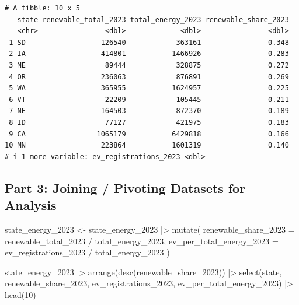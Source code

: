\documentclass[
  letterpaper,
  DIV=11,
  numbers=noendperiod]{scrartcl}
\newenvironment{Shaded}{\begin{snugshade}}{\end{snugshade}}
\newcommand{\AttributeTok}[1]{\textcolor[rgb]{0.40,0.45,0.13}{#1}}
\newcommand{\DecValTok}[1]{\textcolor[rgb]{0.68,0.00,0.00}{#1}}
\newcommand{\FunctionTok}[1]{\textcolor[rgb]{0.28,0.35,0.67}{#1}}
\newcommand{\NormalTok}[1]{\textcolor[rgb]{0.00,0.23,0.31}{#1}}
\newcommand{\OtherTok}[1]{\textcolor[rgb]{0.00,0.23,0.31}{#1}}
\newcommand{\SpecialCharTok}[1]{\textcolor[rgb]{0.37,0.37,0.37}{#1}}
\begin{document}
\begin{verbatim}
# A tibble: 10 x 5
   state renewable_total_2023 total_energy_2023 renewable_share_2023
   <chr>                <dbl>             <dbl>                <dbl>
 1 SD                  126540            363161                0.348
 2 IA                  414801           1466926                0.283
 3 ME                   89444            328875                0.272
 4 OR                  236063            876891                0.269
 5 WA                  365955           1624957                0.225
 6 VT                   22209            105445                0.211
 7 NE                  164503            872370                0.189
 8 ID                   77127            421975                0.183
 9 CA                 1065179           6429818                0.166
10 MN                  223864           1601319                0.140
# i 1 more variable: ev_registrations_2023 <dbl>
\end{verbatim}

\subsection{\texorpdfstring{\textbf{Part 3: Joining / Pivoting Datasets
for
Analysis}}{Part 3: Joining / Pivoting Datasets for Analysis}}\label{part-3-joining-pivoting-datasets-for-analysis}

\begin{Shaded}
\begin{Highlighting}[]
\NormalTok{state\_energy\_2023 }\OtherTok{\textless{}{-}}
\NormalTok{  state\_energy\_2023 }\SpecialCharTok{|\textgreater{}}
  \FunctionTok{mutate}\NormalTok{(}
    \AttributeTok{renewable\_share\_2023 =}\NormalTok{ renewable\_total\_2023 }\SpecialCharTok{/}\NormalTok{ total\_energy\_2023,}
    \AttributeTok{ev\_per\_total\_energy\_2023 =}\NormalTok{ ev\_registrations\_2023 }\SpecialCharTok{/}\NormalTok{ total\_energy\_2023}
\NormalTok{  )}

\NormalTok{state\_energy\_2023 }\SpecialCharTok{|\textgreater{}}
  \FunctionTok{arrange}\NormalTok{(}\FunctionTok{desc}\NormalTok{(renewable\_share\_2023)) }\SpecialCharTok{|\textgreater{}}
  \FunctionTok{select}\NormalTok{(state, renewable\_share\_2023, ev\_registrations\_2023, ev\_per\_total\_energy\_2023) }\SpecialCharTok{|\textgreater{}}
  \FunctionTok{head}\NormalTok{(}\DecValTok{10}\NormalTok{)}
\end{Highlighting}
\end{Shaded}
\end{document}
